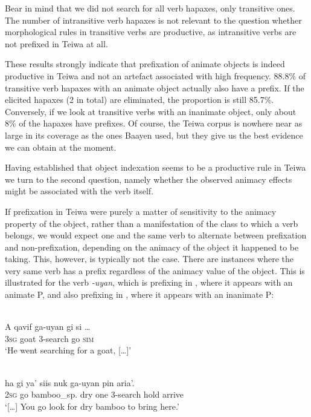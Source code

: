 Bear in mind that we did not search for all verb hapaxes, only transitive ones. The number of intransitive verb hapaxes is not relevant to the question whether morphological rules in transitive verbs are productive, as intransitive verbs are not prefixed in Teiwa at all.

These results strongly indicate that prefixation of animate objects is indeed productive in Teiwa and not an artefact associated with high frequency. 88.8\% of transitive verb hapaxes with an animate object actually also have a prefix. If the elicited hapaxes (2 in total) are eliminated, the proportion is still 85.7\%. Conversely, if we look at transitive verbs with an inanimate object, only about 8\% of the hapaxes have prefixes. Of course, the Teiwa corpus is nowhere near as large in its coverage as the ones Baayen used, but they give us the best evidence we can obtain at the moment.


\newpage
Having established that object indexation seems to be a productive rule in Teiwa we turn to the second question, namely whether the observed animacy effects might be associated with the verb itself. 

If prefixation in Teiwa were purely a matter of sensitivity to the animacy property of the object, rather than a manifestation of the class to which a verb belongs, we would expect one and the same verb to alternate between prefixation and non-prefixation, depending on the animacy of the object it happened to be taking. This, however, is typically not the case. There are instances where the very same verb has a prefix regardless of the animacy value of the object. This is illustrated for the verb \textit{-uyan}, which is prefixing in , where it appears with an animate P, and also prefixing in , where it appears with an inanimate P:


\ea 
\label{ex:10:1241}
 \\ 
 \gll    A  qavif    ga-uyan  gi  si  \dots\\
    3\textsc{sg} goat  3-search  go  \textsc{sim} \\
 \glt `He went searching for a goat, [{\dots}]'

\z



\ea 
\label{ex:10:1242}
 \\ 
 \gll   {\dots}  ha        gi    ya'          siis nuk  ga-uyan   pin   aria'.\\
        {}  2\textsc{sg} go    bamboo\_sp.  dry  one  3-search  hold  arrive \\
 \glt `[{\dots}] You go look for dry bamboo to bring here.'   
\z


